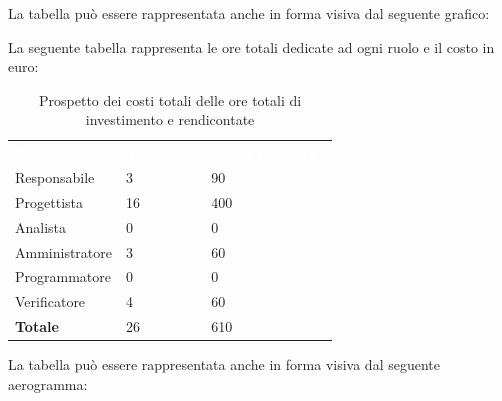 La tabella può essere rappresentata anche in forma visiva dal seguente grafico:

La seguente tabella rappresenta le ore totali dedicate ad ogni ruolo e il costo in euro:

\begin{table}[H]
\begin{center}
\renewcommand{\arraystretch}{1.5}
\begin{tabular}{ m{}<{\centering}  m{}<{\centering} m{}<{\centering}}
	\rowcolor{darkblue}
	\textcolor{white}{\textbf{Ruolo}}&\textcolor{white}{\textbf{Totale ore}}&\textcolor{white}{\textbf{Costo totale (\euro)}}\\ 

	Responsabile  & 3 & 90 \\	
	
	Progettista & 16 & 400 \\
	
	Analista & 0 & 0 \\

	Amministratore & 3 & 60 \\
	
	Programmatore & 0 & 0 \\
	
	Verificatore & 4 & 60 \\
	
	\textbf{Totale} & 26 & 610 \\
	
\end{tabular}
\caption{Prospetto dei costi totali delle ore totali di investimento e rendicontate}
\end{center}
\end{table}

La tabella può essere rappresentata anche in forma visiva dal seguente aerogramma:



